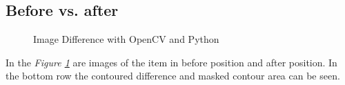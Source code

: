 \subsection{Before vs. after}\label{subsec:beforeafter}
\begin{figure}[ht]
    \centering
    \hfill
    \hfill
    \hfill
    \caption{Image Difference with OpenCV and Python}
    \label{figure: imagework}
\end{figure}

In the \textit{Figure \ref{figure: imagework}} are images of the item in before position and after position. In the bottom row the contoured difference and masked contour area can be seen.  

